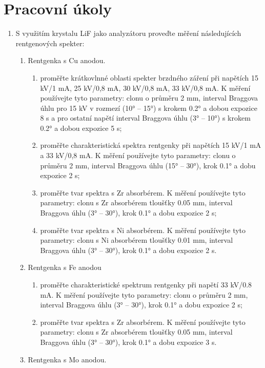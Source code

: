 \documentclass[10pt,a4paper]{article}
\newcommand{\°}{\degree}
\begin{document}


\section{Pracovní úkoly}
\begin{enumerate}
    \item S využitím krystalu LiF jako analyzátoru proveďte měření následujících rentgenových spekter:
    \begin{enumerate}
        \item Rentgenka s Cu anodou.
        \begin{enumerate}
            \item proměřte krátkovlnné oblasti spekter brzdného záření při napětích 15 kV/1 mA, 25 kV/0,8 mA, 30 kV/0,8 mA, 33 kV/0,8 mA. K měření používejte tyto parametry: clonu o průměru 2 mm, interval Braggova úhlu pro 15 kV v rozmezí (10° – 15°) s krokem 0.2° a dobou expozice 8 s a pro ostatní napětí interval Braggova úhlu (3° – 10°) s krokem 0.2° a dobou expozice 5 s;
            \item proměřte charakteristická spektra rentgenky při napětích 15 kV/1 mA a 33 kV/0,8 mA. K měření používejte tyto parametry: clonu o průměru 2 mm, interval Braggova úhlu (15° – 30°), krok 0.1° a dobu expozice 2 s;
            \item proměřte tvar spektra s Zr absorbérem. K měření používejte tyto parametry: clonu s Zr absorbérem tloušťky 0.05 mm, interval Braggova úhlu (3° – 30°), krok 0.1° a dobu expozice 2 s;
            \item proměřte tvar spektra s Ni absorbérem. K měření používejte tyto parametry: clonu s Ni absorbérem tloušťky 0.01 mm, interval Braggova úhlu (3° – 30°), krok 0.1° a dobu expozice 2 s.
        \end{enumerate}
        \item Rentgenka s Fe anodou
        \begin{enumerate}
            \item proměřte charakteristické spektrum rentgenky při napětí 33 kV/0.8 mA. K měření používejte tyto parametry: clonu o průměru 2 mm, interval Braggova úhlu (3° – 30°), krok 0.1° a dobu expozice 2 s;
            \item proměřte tvar spektra s Zr absorbérem. K měření používejte tyto parametry: clonu s Zr absorbérem tloušťky 0.05 mm, interval Braggova úhlu (3° – 30°), krok 0.1° a dobu expozice 3 s.
        \end{enumerate}
        \item Rentgenka s Mo anodou.

\end{enumerate}
\end{enumerate}
\end{document}
